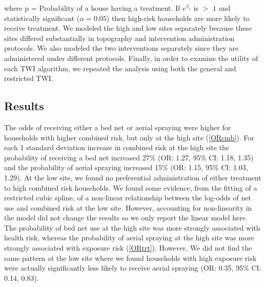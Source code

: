 \documentclass{article}\usepackage[]{graphicx}\usepackage[]{color}
\begin{document}
{where p  =  Probability of a house having a treatment.  If $e^{\beta_1}$ is $>$ 1 and statistically significant ($\alpha = 0.05$) then high-risk households are more likely to receive treatment.  %
We modeled the high and low sites separately because these sites differed substantially in topography and intervention administration protocols.  We also modeled the two interventions separately since they are administered under different protocols.  Finally, in order to examine the utility of each TWI algorithm, we repeated the analysis using both the general and restricted TWI.\\  %




























\subsection{Results}
The odds of receiving either a bed net or aerial spraying were higher for households with higher combined risk,  but only at the high site (\ref{ORcmb}).  For each 1 standard deviation increase in combined risk at the high site the probability of receiving a bed net increased 27\% (OR: 1.27,  95\% CI: 1.18,  1.35) and the probability of aerial spraying increased 15\% (OR: 1.15,  95\% CI: 1.03,  1.29).  At the low site,  we found no preferential administration of either treatment to high combined risk households.  We found some evidence,  from the fitting of a restricted cubic spline,  of a non-linear relationship between the log-odds of net use and combined risk at the low site.  However,  accounting for non-linearity in the model did not change the results so we only report the linear model here.\\ 

The probability of bed net use at the high site was more strongly associated with health risk,  whereas the probability of aerial spraying at the high site was more strongly associated with exposure risk (\ref{ORtrt}).  However,  We did not find the same pattern at the low site where we found households with high exposure risk were actually significantly less likely to receive aerial spraying (OR: 0.35,  95\% CI: 0.14,  0.83).  \\



}
\end{document}
